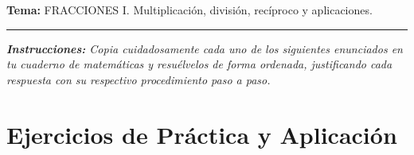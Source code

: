 \documentclass[12pt, letterpaper]{article}
\begin{document}
	\vspace{0.2cm}
	\noindent \textbf{Tema:} FRACCIONES I. Multiplicación, división, recíproco y aplicaciones.
	\vspace{0.2cm}
	\hrule
	\vspace{0.4cm}
	
	\noindent \textit{\textbf{Instrucciones:} Copia cuidadosamente cada uno de los siguientes enunciados en tu cuaderno de matemáticas y resuélvelos de forma ordenada, justificando cada respuesta con su respectivo procedimiento paso a paso.}
	\vspace{0.6cm}
	
	\section*{Ejercicios de Práctica y Aplicación}
	
\end{document}
